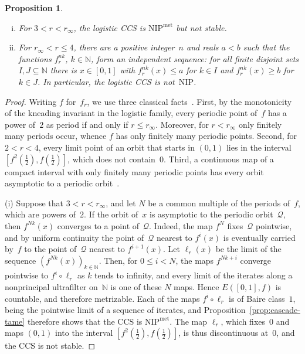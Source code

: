\documentclass[psamsfonts]{amsart}
\newtheorem{prop}[thm]{Proposition}
\theoremstyle{definition}
\theoremstyle{remark}
\newcommand{\NIP}{\text{NIP}}
\numberwithin{equation}{section}
\begin{document}
\begin{prop}\label{prop:logistic-all}
\begin{enumerate}[(i)]
\item
  For $3<r<r_\infty$, the logistic CCS is $\NIP^{\mathrm{met}}$ but not stable.
\item
  For $r_\infty<r\le4$, there are a positive integer~$n$ and reals $a<b$ such that the functions $f_r^{nk}$, $k\in\mathbb{N}$, form an independent sequence:
  for all finite disjoint sets $I,J\subseteq\mathbb{N}$ there is $x\in[0,1]$ with $f_r^{nk}(x)\le a$ for $k\in I$ and $f_r^{nk}(x)\ge b$ for $k\in J$.
  In particular, the logistic CCS is not~$\NIP$.
\end{enumerate}
\end{prop}

\begin{proof}
Writing $f$ for~$f_r$, we use three classical facts~\cite{MilnorThurston1988,BlockCoppel1992,deMeloVanStrien1993}.
First, by the monotonicity of the kneading invariant in the logistic family, every periodic point of~$f$ has a power of~$2$ as period if and only if $r\le r_\infty$.
Moreover, for $r<r_\infty$ only finitely many periods occur, whence $f$ has only finitely many periodic points.
Second, for $2<r<4$, every limit point of an orbit that starts in $(0,1)$ lies in the interval $[f^2(\frac12),f(\frac12)]$, which does not contain~$0$.
Third, a continuous map of a compact interval with only finitely many periodic points has every orbit asymptotic to a periodic orbit~\cite{BlockCoppel1992}.

(i) Suppose that $3<r<r_\infty$, and let $N$ be a common multiple of the periods of~$f$, which are powers of~$2$.
If the orbit of~$x$ is asymptotic to the periodic orbit~$\mathcal{Q}$, then $f^{Nk}(x)$ converges to a point of~$\mathcal{Q}$.
Indeed, the map $f^N$ fixes~$\mathcal{Q}$ pointwise, and by uniform continuity the point of~$\mathcal{Q}$ nearest to $f^i(x)$ is eventually carried by~$f$ to the point of~$\mathcal{Q}$ nearest to $f^{i+1}(x)$.
Let $\ell_r(x)$ be the limit of the sequence $(f^{Nk}(x))_{k\in\mathbb{N}}$.
Then, for $0\le i<N$, the maps $f^{Nk+i}$ converge pointwise to $f^i\circ\ell_r$ as $k$ tends to infinity, and every limit of the iterates along a nonprincipal ultrafilter on~$\mathbb{N}$ is one of these $N$ maps.
Hence $E([0,1],f)$ is countable, and therefore metrizable.
Each of the maps $f^i\circ\ell_r$ is of Baire class~$1$, being the pointwise limit of a sequence of iterates, and Proposition~\ref{prop:cascade-tame} therefore shows that the CCS is $\NIP^{\mathrm{met}}$.
The map $\ell_r$, which fixes~$0$ and maps $(0,1)$ into the interval $[f^2(\frac12),f(\frac12)]$, is thus discontinuous at~$0$, and the CCS is not stable.


\end{proof}
\end{document}
